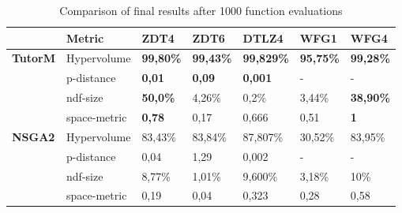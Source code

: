     \begin{table}[]
        \centering
        \caption{Comparison of final results after 1000 function evaluations}
        \begin{tabular}{@{}lllllll@{}}
        \toprule
                                                                                                & Metric        & ZDT4             & ZDT6             & DTLZ4             & WFG1             & WFG4             \\ \midrule
        \multirow{4}{*}{\textbf{TutorM}}                                                          & Hypervolume   & \textbf{99,80\%} & \textbf{99,43\%} & \textbf{99,829\%} & \textbf{95,75\%} & \textbf{99,28\%} \\ \cmidrule(l){2-7} 
                                                                                                & p-distance    & \textbf{0,01}    & \textbf{0,09}    & \textbf{0,001}    & -                & -                \\ \cmidrule(l){2-7} 
                                                                                                & ndf-size      & \textbf{50,0\%}  & 4,26\%           & 0,2\%             & 3,44\%           & \textbf{38,90\%} \\ \cmidrule(l){2-7} 
                                                                                                & space-metric  & \textbf{0,78}    & 0,17             & 0,666             & 0,51             & \textbf{1}       \\ \midrule
        \multirow{4}{*}{\textbf{NSGA2}}                                                           & Hypervolume   & 83,43\%          & 83,84\%          & 87,807\%          & 30,52\%          & 83,95\%          \\ \cmidrule(l){2-7} 
                                                                                                & p-distance    & 0,04             & 1,29             & 0,002             & -                & -                \\ \cmidrule(l){2-7} 
                                                                                                & ndf-size      & 8,77\%           & 1,01\%           & 9,600\%           & 3,18\%           & 10\%             \\ \cmidrule(l){2-7} 
                                                                                                & space-metric  & 0,19             & 0,04             & 0,323             & 0,28             & 0,58             \\ \midrule

\end{tabular}
\end{table}
